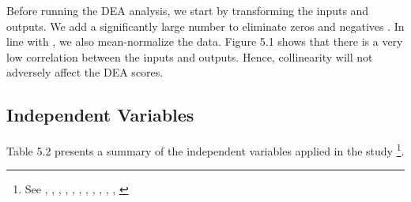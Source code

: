 \documentclass[a4paper, nobind]{templates/ociamthesis}
\begin{document}
Before running the DEA analysis, we start by transforming the inputs and outputs. We add a significantly large number to eliminate zeros and negatives \autocite{ataullah2006economic}. In line with \textcite{avkiran2006productivity}, we also mean-normalize the data. Figure 5.1 shows that there is a very low correlation between the inputs and outputs. Hence, collinearity will not adversely affect the DEA scores.

\hypertarget{independent-variables}{%
\subsection{Independent Variables}\label{independent-variables}}

Table 5.2 presents a summary of the independent variables applied in the study \footnote{See \textcite{jensen1976theory}, \textcite{titman1988determinants}, \textcite{ledgerwood1998microfinance}, \textcite{kyereboah2007determinants}, \textcite{kraay2010worldwide}, \textcite{allen2014african}, \textcite{kurshev2015firm}, \textcite{bayai2016financing}, \textcite{schnyder2018twenty}, \textcite{kimmel2018financial}, \textcite{ito2018quantity}, \textcite{market2018global}}.
\end{document}
